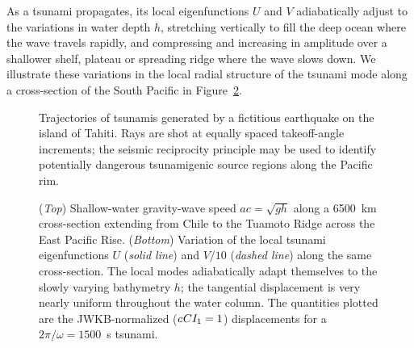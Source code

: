 As a tsunami propagates, its local eigenfunctions $U$ and $V$
adiabatically adjust to the variations in water depth $h$,
stretching vertically to fill the deep ocean where the wave
travels rapidly, and compressing and increasing in amplitude
over a shallower shelf, plateau or spreading ridge where the
wave slows down.  We illustrate these variations in the local
radial structure of the tsunami mode along a cross-section
of the South Pacific in Figure~\ref{fig:16.tsunami_locmod}.
\begin{figure}[!t]
\begin{center}
\end{center}
\caption[tsunami_rec]{\label{fig:16.tsunami_rec}
Trajectories of tsunamis generated by a fictitious earthquake
on the island of Tahiti.  Rays are shot at equally spaced
takeoff-angle increments; the seismic reciprocity principle
may be used to identify potentially dangerous tsunamigenic
source regions along the Pacific rim.
}
\end{figure}
\begin{figure}[!b]
\begin{center}
\end{center}
\caption[tsunami_locmod]{\label{fig:16.tsunami_locmod}
({\em Top\/}) Shallow-water gravity-wave speed $ac=\sqrt{gh}$
along a 6500~km cross-section extending from Chile
to the Tuamoto Ridge across the East Pacific Rise.
({\em Bottom\/}) Variation of the local tsunami
eigenfunctions $U$ ({\em solid line\/}) and $V/10$
({\em dashed line\/}) along the same cross-section.
The local modes adiabatically adapt themselves to the
slowly varying bathymetry $h$; the tangential displacement
is very nearly uniform throughout the water column.  The
quantities plotted are the JWKB-normalized ($c\hspace{0.2 mm}CI_1=1$)
displacements for a $2\pi/\omega=1500$~s tsunami.
}
\end{figure}

